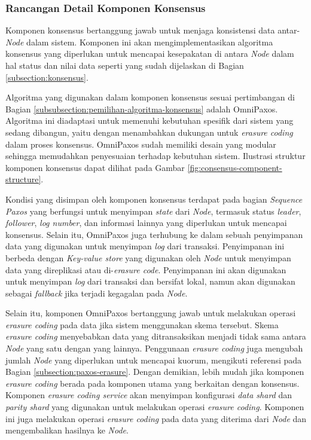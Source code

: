 \subsubsection{Rancangan Detail Komponen Konsensus}
\label{subsubsection:detail-komponen-konsensus}

Komponen konsensus bertanggung jawab untuk menjaga konsistensi data antar-\textit{Node} dalam sistem. Komponen ini akan mengimplementasikan algoritma konsensus yang diperlukan untuk mencapai kesepakatan di antara \textit{Node} dalam hal status dan nilai data seperti yang sudah dijelaskan di Bagian \ref{subsection:konsensus}.

Algoritma yang digunakan dalam komponen konsensus sesuai pertimbangan di Bagian \ref{subsubsection:pemilihan-algoritma-konsensus} adalah OmniPaxos. Algoritma ini diadaptasi untuk memenuhi kebutuhan spesifik dari sistem yang sedang dibangun, yaitu dengan menambahkan dukungan untuk \textit{erasure coding} dalam proses konsensus. OmniPaxos sudah memiliki desain yang modular sehingga memudahkan penyesuaian terhadap kebutuhan sistem. Ilustrasi struktur komponen konsensus dapat dilihat pada Gambar \ref{fig:consensus-component-structure}.

Kondisi yang disimpan oleh komponen konsensus terdapat pada bagian \textit{Sequence Paxos} yang berfungsi untuk menyimpan \textit{state} dari \textit{Node}, termasuk status \textit{leader}, \textit{follower}, \textit{log number}, dan informasi lainnya yang diperlukan untuk mencapai konsensus. Selain itu, OmniPaxos juga terhubung ke dalam sebuah penyimpanan data yang digunakan untuk menyimpan \textit{log} dari transaksi. Penyimpanan ini berbeda dengan \textit{Key-value store} yang digunakan oleh \textit{Node} untuk menyimpan data yang direplikasi atau di-\textit{erasure code}. Penyimpanan ini akan digunakan untuk menyimpan \textit{log} dari transaksi dan bersifat lokal, namun akan digunakan sebagai \textit{fallback} jika terjadi kegagalan pada \textit{Node}.

Selain itu, komponen OmniPaxos bertanggung jawab untuk melakukan operasi \textit{erasure coding} pada data jika sistem menggunakan skema tersebut. Skema \textit{erasure coding} menyebabkan data yang ditransaksikan menjadi tidak sama antara \textit{Node} yang satu dengan yang lainnya. Penggunaan \textit{erasure coding} juga mengubah jumlah \textit{Node} yang diperlukan untuk mencapai kuorum, mengikuti referensi pada Bagian \ref{subsection:paxos-erasure}. Dengan demikian, lebih mudah jika komponen \textit{erasure coding} berada pada komponen utama yang berkaitan dengan konsensus. Komponen \textit{erasure coding service} akan menyimpan konfigurasi \textit{data shard} dan \textit{parity shard} yang digunakan untuk melakukan operasi \textit{erasure coding}. Komponen ini juga melakukan operasi \textit{erasure coding} pada data yang diterima dari \textit{Node} dan mengembalikan hasilnya ke \textit{Node}.

